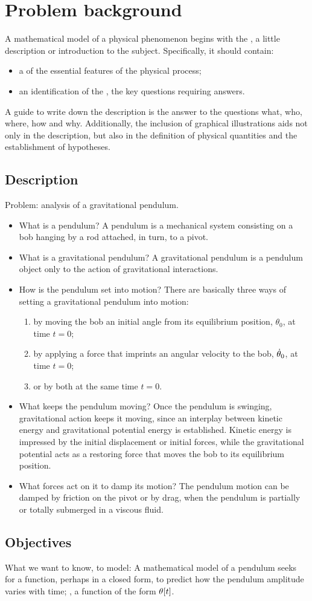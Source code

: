 \section{Problem background}
A mathematical model of a physical phenomenon begins with the , a little description or introduction to the subject. Specifically, it should contain:
\begin{itemize}
\item a  of the essential features of the physical process;
\item an identification of the , the key questions requiring answers.
\end{itemize}

A guide to write down the description is the answer to the questions what, who, where, how and why. Additionally, the inclusion of graphical illustrations aids not only in the description, but also in the definition of physical quantities and the establishment of hypotheses.


\subsection{Description}
Problem: analysis of a gravitational pendulum.

\begin{itemize}
\item What is a pendulum? A pendulum is a mechanical system consisting on a bob hanging by a rod attached, in turn, to a pivot.
%
\item What is a gravitational pendulum? A gravitational pendulum is a pendulum object only to the action of gravitational interactions.
%
\item How is the pendulum set into motion? There are basically three ways of setting a gravitational pendulum into motion:
%
    \begin{enumerate}
    \item by moving the bob an initial angle from its equilibrium position, $\theta_0$, at time $t = 0$;
    \item by applying a force that imprints an angular velocity to the bob, $\dot{\theta}_0$, at time $t = 0$;
    \item or by both at the same time $t = 0$.
    \end{enumerate}
%
\item What keeps the pendulum moving? Once the pendulum is swinging, gravitational action keeps it moving, since an interplay between kinetic energy and gravitational potential energy is established. Kinetic energy is impressed by the initial displacement or initial forces, while the gravitational potential acts as a restoring force that moves the bob to its equilibrium position.
%
\item What forces act on it to damp its motion? The pendulum motion can be damped by friction on the pivot or by drag, when the pendulum is partially or totally submerged in a viscous fluid.
\end{itemize}


\subsection{Objectives}
What we want to know, to model: A mathematical model of a pendulum seeks for a function, perhaps in a closed form, to predict how the pendulum amplitude varies with time; \ie, a function of the form $\theta\!\left[{t}\right]$. 
